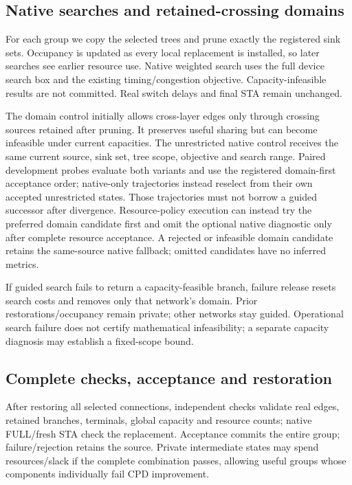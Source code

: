 \documentclass[conference,10pt]{IEEEtran}
\begin{document}
\subsection{Native searches and retained-crossing domains}
For each group we copy the selected trees and prune exactly the registered sink sets. Occupancy is updated as every local replacement is installed, so later searches see earlier resource use. Native weighted search uses the full device search box and the existing timing/congestion objective. Capacity-infeasible results are not committed. Real switch delays and final STA remain unchanged.

The domain control initially allows cross-layer edges only through crossing sources retained after pruning. It preserves useful sharing but can become infeasible under current capacities. The unrestricted native control receives the same current source, sink set, tree scope, objective and search range. Paired development probes evaluate both variants and use the registered domain-first acceptance order; native-only trajectories instead reselect from their own accepted unrestricted states. Those trajectories must not borrow a guided successor after divergence. Resource-policy execution can instead try the preferred domain candidate first and omit the optional native diagnostic only after complete resource acceptance. A rejected or infeasible domain candidate retains the same-source native fallback; omitted candidates have no inferred metrics.

If guided search fails to return a capacity-feasible branch, failure release resets search costs and removes only that network's domain. Prior restorations/occupancy remain private; other networks stay guided. Operational search failure does not certify mathematical infeasibility; a separate capacity diagnosis may establish a fixed-scope bound.

\subsection{Complete checks, acceptance and restoration}
After restoring all selected connections, independent checks validate real edges, retained branches, terminals, global capacity and resource counts; native FULL/fresh STA check the replacement. Acceptance commits the entire group; failure/rejection retains the source. Private intermediate states may spend resources/slack if the complete combination passes, allowing useful groups whose components individually fail CPD improvement.
\end{document}
